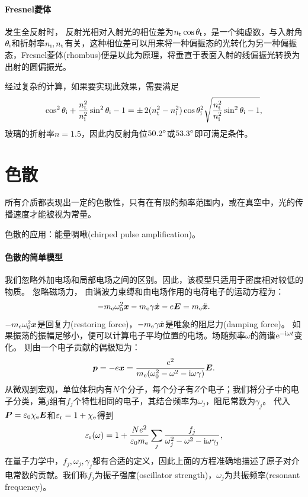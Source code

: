 \paragraph{Fresnel菱体}
发生全反射时，
反射光相对入射光的相位差为$n_\text t\cos\theta_\text t$，是一个纯虚数，与入射角$\theta_{\mathrm{i}}$和折射率$n_{\mathrm{i}},n_\text t$有关，这种相位差可以用来将一种偏振态的光转化为另一种偏振态，Fresnel菱体(rhombus)便是以此为原理，将垂直于表面入射的线偏振光转换为出射的圆偏振光。

经过复杂的计算，如果要实现此效果，需要满足
\[
    \cos^2\theta_{\mathrm{i}}+\frac{n_\text t^2}{n_{\mathrm{i}}^2}\sin^2\theta_{\mathrm{i}}-1=\pm\,2(n_\text t^2-n_{\mathrm{i}}^2)\cos\theta_{\mathrm{i}}^2\sqrt{\frac{n_\text t^2}{n_{\mathrm{i}}^2}\sin^2\theta_{\mathrm{i}}-1},
\]
玻璃的折射率$n=1.5$，因此内反射角位$50.2^\circ$或$53.3^\circ$即可满足条件。

\section{色散}
所有介质都表现出一定的色散性，只有在有限的频率范围内，或在真空中，光的传播速度才能被视为常量。

色散的应用：能量啁啾(chirped pulse amplification)。
\paragraph{色散的简单模型}
我们忽略外加电场和局部电场之间的区别。因此，该模型只适用于密度相对较低的物质。
忽略磁场力，
由谐波力束缚和由电场作用的电荷电子的运动方程为：
\[
    -m_\mathrm e\omega_0^2\bm x-m_\mathrm e\gamma\dot{\bm x}-e\bm E=m_\mathrm e\ddot{\bm x}.
\]
$-m_\mathrm e\omega_0^2\bm x$是回复力(restoring force)，$-m_\mathrm e\gamma\dot{\bm x}$是唯象的阻尼力(damping force)。
如果振荡的振幅足够小，便可以计算电子平均位置的电场。场随频率$\omega$的简谐$\mathop{}\!\mathrm{e}^{-\mathrm{i}\omega t}$变化。
则由一个电子贡献的偶极矩为：
\[
    \bm p=-e\bm x=\frac{e^2}{m_\mathrm e(\omega_0^2-\omega^2-\mathrm{i}\omega\gamma)}\bm E.
\]
从微观到宏观，单位体积内有$N$个分子，每个分子有$Z$个电子；我们将分子中的电子分类，第$j$组有$f_j$个特性相同的电子，其结合频率为$\omega_j$，阻尼常数为$\gamma_j$。
代入$\bm P=\varepsilon_0\chi_\mathrm e\bm E$和$\varepsilon_\text r=1+\chi_\mathrm e$得到
\begin{equation}
    \varepsilon_\text r(\omega)=1+\frac{Ne^2}{\varepsilon_0m_\mathrm e}\sum_j\frac{f_j}{\omega_j^2-\omega^2-\mathrm{i}\omega\gamma_j},
\end{equation}
在量子力学中，$f_j,\omega_j,\gamma_j$都有合适的定义，因此上面的方程准确地描述了原子对介电常数的贡献。我们称$f_j$为振子强度(oscillator strength)，$\omega_j$为共振频率(resonant frequency)。

